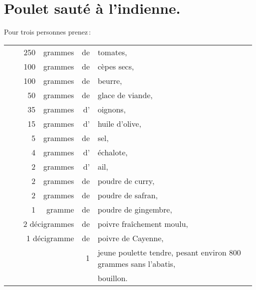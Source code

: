 \section*{\centering Poulet sauté à l’indienne.}
{}

Pour trois personnes prenez :

\medskip

\footnotesize
\begin{longtable}{rrrrrp{18em}}
  & \hspace{2em} &  250 & grammes & de & tomates,                                                         \\
  &              &  100 & grammes & de & cèpes secs,                                                      \\
  &              &  100 & grammes & de & beurre,                                                          \\
  &              &   50 & grammes & de & glace de viande,                                                 \\
  &              &   35 & grammes & d' & oignons,                                                         \\
  &              &   15 & grammes & d' & huile d'olive,                                                   \\
  &              &    5 & grammes & de & sel,                                                             \\
  &              &    4 & grammes & d' & échalote,                                                        \\
  &              &    2 & grammes & d' & ail,                                                             \\
  &              &    2 & grammes & de & poudre de curry,                                                 \\
  &              &    2 & grammes & de & poudre de safran,                                                \\
  &              &    1 & gramme  & de & poudre de gingembre,                                             \\
  & \multicolumn{3}{r}{2 décigrammes}  & de & poivre fraîchement moulu,                                   \\
  & \multicolumn{3}{r}{1  décigramme}  & de & poivre de Cayenne,                                          \\
  &              &      &         &  1 & jeune poulette tendre, pesant environ 800 grammes sans l'abatis, \\
  &              &      &         &    & bouillon.                                                        \\
\end{longtable}
\normalsize

